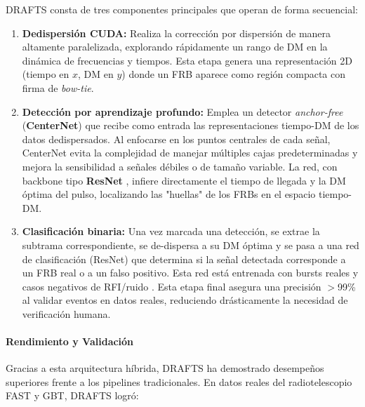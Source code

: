 DRAFTS consta de tres componentes principales que operan de forma secuencial:

\begin{enumerate}
    \item \textbf{Dedispersión CUDA:} Realiza la corrección por dispersión de manera altamente paralelizada, explorando rápidamente un rango de DM en la dinámica de frecuencias y tiempos. Esta etapa genera una representación 2D (tiempo en $x$, DM en $y$) donde un FRB aparece como región compacta con firma de \textit{bow-tie}.
    
    \item \textbf{Detección por aprendizaje profundo:} Emplea un detector \textit{anchor-free} (\textbf{CenterNet}) \citep{Zhou_2019_CenterNet} que recibe como entrada las representaciones tiempo-DM de los datos dedispersados. Al enfocarse en los puntos centrales de cada señal, CenterNet evita la complejidad de manejar múltiples cajas predeterminadas y mejora la sensibilidad a señales débiles o de tamaño variable. La red, con backbone tipo \textbf{ResNet} \citep{He_2015_ResNet}, infiere directamente el tiempo de llegada y la DM óptima del pulso, localizando las "huellas" de los FRBs en el espacio tiempo-DM.
    
    \item \textbf{Clasificación binaria:} Una vez marcada una detección, se extrae la subtrama correspondiente, se de-dispersa a su DM óptima y se pasa a una red de clasificación (ResNet) que determina si la señal detectada corresponde a un FRB real o a un falso positivo. Esta red está entrenada con bursts reales y casos negativos de RFI/ruido \citep{Agarwal_2020,zhang2024drafts}. Esta etapa final asegura una precisión $>$99\% al validar eventos en datos reales, reduciendo drásticamente la necesidad de verificación humana.
\end{enumerate}

\paragraph{Rendimiento y Validación}

Gracias a esta arquitectura híbrida, DRAFTS ha demostrado desempeños superiores frente a los pipelines tradicionales. En datos reales del radiotelescopio FAST y GBT, DRAFTS logró:

